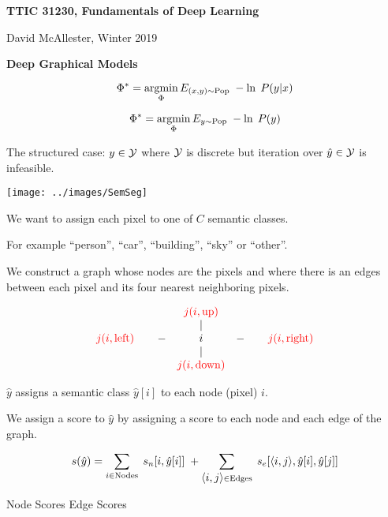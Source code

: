 




{\Huge

  \centerline{\bf TTIC 31230, Fundamentals of Deep Learning}
  \bigskip
  \centerline{David McAllester, Winter 2019}
  \vfill
  \vfill
  \centerline{\bf Deep Graphical Models}
\vfill
\vfill
\vfill


\vfill
{\color{red}
$$\Phi^* = \operatorname*{argmin}_\Phi E_{(x,y) \sim \mathrm{Pop}}\;-\ln \;P(y|x)$$

\vfill
$$\Phi^* = \operatorname*{argmin}_\Phi E_{y \sim \mathrm{Pop}}\;-\ln \;P(y)$$
}

{\color{red} The structured case:} $y \in {\cal Y}$ where ${\cal Y}$ is discrete but {\color{red} iteration over $\hat{y} \in {\cal Y}$ is infeasible}.
\centerline{\texttt{[image: ../images/SemSeg]}}

\vfill
We want to assign each pixel to one of $C$ semantic classes.

\vfill
For example ``person'', ``car'', ``building'', ``sky'' or ``other''.


We construct a graph whose nodes are the pixels and where there is an edges between each pixel and its four nearest neighboring pixels.

\vfill
$$\begin{array}{ccccc}
 & & {\color{red} j(i,\mathrm{up})} \\
 & & | \\
 {\color{red} j(i,\mathrm{left})}\;\;\;\; & -& i & -& \;\;\;\;{\color{red} j(i,\mathrm{right})} \\
 & & | \\
 & & {\color{red} j(i,\mathrm{down})}
 \end{array}$$


$\hat{y} $ assigns a semantic class $\hat{y}[i]$ to each node (pixel) $i$.

\vfill
We assign a score to $\hat{y}$ by assigning a score to each node and each edge of the graph.

{\color{red} $$s(\hat{y}) = \sum_{i \in \mathrm{Nodes}}\; s_n[i,\hat{y}[i]]\; + \sum_{{\mbox{$\langle i,j\rangle$}} \in \mathrm{Edges}}\;s_e[{\mbox{$\langle i,j\rangle$}},\hat{y}[i],\hat{y}[j]]$$}
\centerline{Node Scores \hspace{6em}Edge Scores \hspace{3em}~}

}
